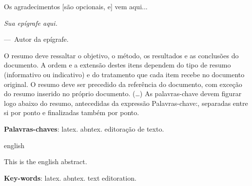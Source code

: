 \documentclass[
	12pt,				%
	openright,			%
	oneside,			%
	a4paper,			%
	english,			%
	brazil				%
	]{abntex2}
\begin{document}

%     


\begin{folhadeaprovacao}

\end{folhadeaprovacao}


\begin{agradecimentos}
\noindent Os agradecimentos [são opcionais, e] vem aqui...
\end{agradecimentos}

\begin{epigrafe}
    \vspace*{\fill}
\epigraph{\textsl{Sua epígrafe aqui.}}{---~Autor da epígrafe.}
\end{epigrafe}


\setlength{\absparsep}{18pt} %
\begin{resumo}
 \noindent O resumo deve ressaltar o objetivo, o método, os resultados e as conclusões do documento. A ordem e a extensão
 destes itens dependem do tipo de resumo (informativo ou indicativo) e do tratamento que cada item recebe no documento original. O resumo deve ser precedido da referência do documento, com exceção do resumo inserido no
 próprio documento. (\ldots) As palavras-chave devem figurar logo abaixo do resumo, antecedidas da expressão Palavras-chave:, separadas entre si por
 ponto e finalizadas também por ponto.

 \textbf{Palavras-chaves}: latex. abntex. editoração de texto.
\end{resumo}

\begin{resumo}[Abstract]
 \begin{otherlanguage*}{english}

\noindent This is the english abstract.

   \vspace{\onelineskip}

   \noindent
   \textbf{Key-words}: latex. abntex. text editoration.
 \end{otherlanguage*}
\end{resumo}
\end{document}

